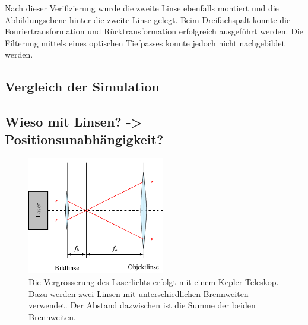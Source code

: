 Nach dieser Verifizierung wurde die zweite Linse ebenfalls montiert und die Abbildungsebene hinter die zweite Linse gelegt.
Beim Dreifachspalt konnte die Fouriertransformation und Rücktransformation erfolgreich ausgeführt werden.
Die Filterung mittels eines optischen Tiefpasses konnte jedoch nicht nachgebildet werden.

\subsection{Vergleich der Simulation}

\subsection{Wieso mit Linsen? -> Positionsunabhängigkeit?}

\begin{figure}
    \centering
    \includegraphics[width=60mm]{papers/opt/images/laserAufweiten.pdf}
    \caption{Die Vergrösserung des Laserlichts erfolgt mit einem Kepler-Teleskop.
        Dazu werden zwei Linsen mit unterschiedlichen Brennweiten verwendet.
        Der Abstand dazwischen ist die Summe der beiden Brennweiten.}
    \label{opt:fig:laserAufweiten}
\end{figure}
